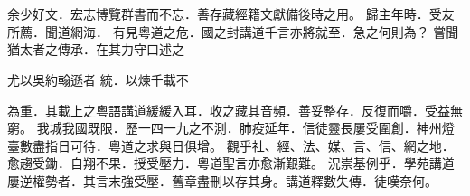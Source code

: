 \documentclass{book}
\begin{document}
\begin{sloppypar}

\chapter*{}

\begin{paracol}{2}

\fontsize{11}{13}\leftfont \Large {} \leftfont 余少好文．宏志博覽群書而不忘．善存藏經籍文獻備後時之用。 \leftfont 歸主年時．受友所薦．聞道網海．\switchcolumn\fontsize{11}{13}\rightfont \Large {} \rightfont 有見粵道之危．國之封講道千言亦將就至．急之何則為？ \rightfont 嘗聞猶太者之傳承．在其力守口述之

\end{paracol}


\begin{paracol}{3}

\fontsize{11}{13}\leftfont \Large 尤以吳約翰遜者 \switchcolumn[2]\fontsize{11}{13}\rightfont \Large 統．以煉千載不

\end{paracol}

\begin{paracol}{3}\fontsize{11}{13}\leftfont \Large 為重．其載上之粵語講道緩緩入耳．收之藏其音頻．善妥整存．反復而嚼．受益無窮。 \leftfont 我城我國既限．歷一四一九之不測．肺疫延年．信徒靈長屢受圍創．神州燈臺數盡指日可待．粵道之求與日俱增。 \leftfont 觀乎社、經、法、媒、言、信、網之地．愈趨受鋤．自翔不果．授受壓力．粵道聖言亦愈漸艱難。 \leftfont 況崇基例乎．學苑講道屢逆權勢者．其言末強受壓．舊章盡刪以存其身。講道釋數失傳．徒嘆奈何。

\switchcolumn

\fontsize{11}{13}\centerfont 
{}
\Large 


\end{paracol}
\end{sloppypar}
\end{document}
